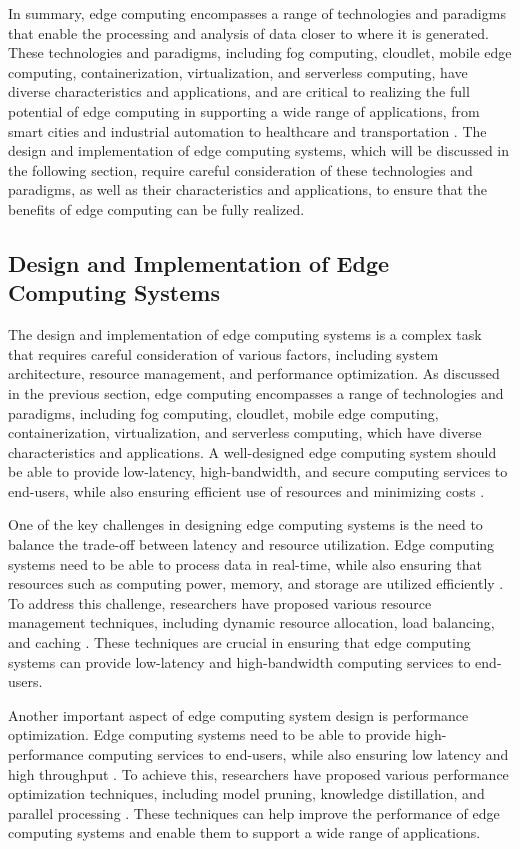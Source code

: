 \documentclass[11pt]{article}
\begin{document}
In summary, edge computing encompasses a range of technologies and paradigms that enable the processing and analysis of data closer to where it is generated. These technologies and paradigms, including fog computing, cloudlet, mobile edge computing, containerization, virtualization, and serverless computing, have diverse characteristics and applications, and are critical to realizing the full potential of edge computing in supporting a wide range of applications, from smart cities and industrial automation to healthcare and transportation \cite{ref2}. The design and implementation of edge computing systems, which will be discussed in the following section, require careful consideration of these technologies and paradigms, as well as their characteristics and applications, to ensure that the benefits of edge computing can be fully realized.

\subsection{Design and Implementation of Edge Computing Systems}

The design and implementation of edge computing systems is a complex task that requires careful consideration of various factors, including system architecture, resource management, and performance optimization. As discussed in the previous section, edge computing encompasses a range of technologies and paradigms, including fog computing, cloudlet, mobile edge computing, containerization, virtualization, and serverless computing, which have diverse characteristics and applications. A well-designed edge computing system should be able to provide low-latency, high-bandwidth, and secure computing services to end-users, while also ensuring efficient use of resources and minimizing costs \cite{ref2}.

One of the key challenges in designing edge computing systems is the need to balance the trade-off between latency and resource utilization. Edge computing systems need to be able to process data in real-time, while also ensuring that resources such as computing power, memory, and storage are utilized efficiently \cite{ref34}. To address this challenge, researchers have proposed various resource management techniques, including dynamic resource allocation, load balancing, and caching \cite{ref35}. These techniques are crucial in ensuring that edge computing systems can provide low-latency and high-bandwidth computing services to end-users.

Another important aspect of edge computing system design is performance optimization. Edge computing systems need to be able to provide high-performance computing services to end-users, while also ensuring low latency and high throughput \cite{ref36}. To achieve this, researchers have proposed various performance optimization techniques, including model pruning, knowledge distillation, and parallel processing \cite{ref37}. These techniques can help improve the performance of edge computing systems and enable them to support a wide range of applications.
\end{document}
